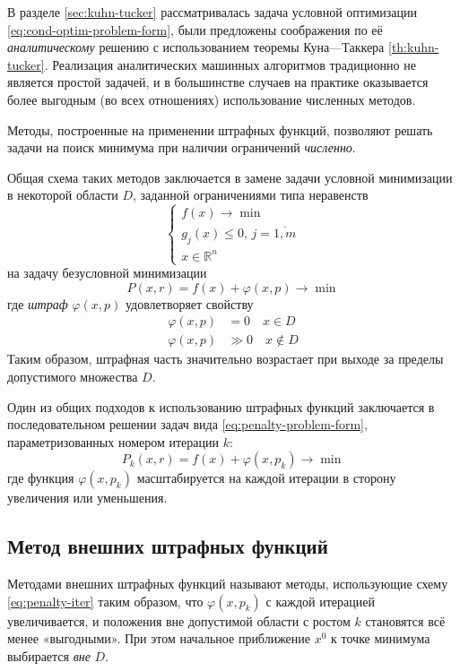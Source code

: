 \documentclass{article}
\renewcommand{\phi}{\varphi}
\renewcommand{\leq}{\leqslant}
\providecommand{\neword}{\emph}
\providecommand{\set}[1]{\mathbb{#1}}
\theoremstyle{remark}
\theoremstyle{definition}
\numberwithin{equation}{section}
\begin{document}
В разделе \ref{sec:kuhn-tucker} рассматривалась задача условной
оптимизации \eqref{eq:cond-optim-problem-form}, были предложены
соображения по её \emph{аналитическому} решению с использованием
теоремы Куна—Таккера \ref{th:kuhn-tucker}. Реализация аналитических
машинных алгоритмов традиционно не является простой задачей, и в
большинстве случаев на практике оказывается более выгодным (во всех
отношениях) использование численных методов.

Методы, построенные на применении штрафных функций, позволяют решать
задачи на поиск минимума при наличии ограничений \emph{численно}.

Общая схема таких методов заключается в замене задачи условной
минимизации в некоторой области $D$, заданной ограничениями типа
неравенств
\begin{equation*}
  \begin{cases}
    f(x) \to \min \\
    g_j(x) \leq 0,\, j=\overline{1,m} \\
    x \in \set{R}^n
  \end{cases}
\end{equation*}
на задачу безусловной минимизации
\begin{equation}
  \label{eq:penalty-problem-form}
  P(x, r) = f(x) + \phi(x, p) \to \min
\end{equation}
где \neword{штраф} $\phi(x, p)$ удовлетворяет свойству
\begin{align*}
  \phi(x, p) &= 0 \quad x \in D\\
  \phi(x, p) &\gg 0 \quad x \notin D
\end{align*}
Таким образом, штрафная часть значительно возрастает при выходе за
пределы допустимого множества $D$.

Один из общих подходов к использованию штрафных функций заключается в
последовательном решении задач вида \ref{eq:penalty-problem-form},
параметризованных номером итерации $k$:
\begin{equation}
  \label{eq:penalty-iter}
  P_k(x, r) = f(x) + \phi(x, p_k) \to \min  
\end{equation}
где функция $\phi(x, p_k)$ масштабируется на каждой итерации в сторону
увеличения или уменьшения.

\subsection{Метод внешних штрафных функций}

Методами внешних штрафных функций называют методы, использующие схему
\eqref{eq:penalty-iter} таким образом, что $\phi(x, p_k)$ с каждой
итерацией увеличивается, и положения вне допустимой области с ростом
$k$ становятся всё менее «выгодными». При этом начальное приближение
$x^0$ к точке минимума выбирается \emph{вне} $D$.
\end{document}
